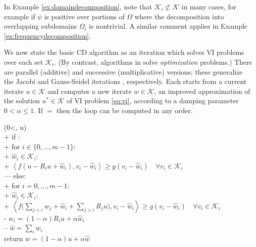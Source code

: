 \documentclass[letterpaper,final,12pt,reqno]{amsart}
\theoremstyle{cstyle}
\theoremstyle{dstyle}
\numberwithin{equation}{section}
\numberwithin{figure}{section}
\numberwithin{table}{section}
\numberwithin{theorem}{section}
\newcommand{\cK}{\mathcal{K}}
\newcommand{\ip}[2]{\left<#1,#2\right>}
\begin{document}
In Example \ref{ex:domaindecomposition}, note that $\cK_i \not\subset \cK$ in many cases, for example if $\psi$ is positive over portions of $\Omega$ where the decomposition into overlapping subdomains $\Omega_i$ is nontrivial.  A similar comment applies in Example \ref{ex:frequencydecomposition}.

We now state the basic CD algorithm as an iteration which solves VI problems over each set $\cK_i$.  (By contrast, algorithms in \cite{Tai2003} solve \emph{optimization} problems.)  There are parallel (additive) and successive (multiplicative) versions; these generalize the Jacobi and Gauss-Seidel iterations \cite{Greenbaum1997}, respectively.  Each starts from a current iterate $u \in \cK$ and computes a new iterate $w\in\cK$, an improved approximation of the solution $u^* \in \cK$ of VI problem \eqref{eq:vi}, according to a damping parameter $0<\alpha\le 1$.  If  $=$  then the  loop can be computed in any order.

\begin{pseudo*}
(0<\alpha{}, u\in\cK)\text{:} \\+
    if : \\+
        for $i \in \{0,\dots,m-1\}$: \\+
            $\hat w_i\in \cK_i$: \\+
                 $\boxed{\ip{f(u - R_i u + \hat w_i)}{v_i-\hat w_i} \ge g(v_i-\hat w_i)} \quad \forall v_i\in \cK_i$ \\---
    else: \\+
        for $i = 0,\dots,m-1$: \\+
            $\hat w_i\in \cK_i$: \\+
                $\displaystyle \boxed{\ip{f\Big(\sum_{j<i} w_j + \hat w_i + \sum_{j>i} R_j u\Big)}{v_i-\hat w_i} \ge g(v_i-\hat w_i)} \quad \forall v_i\in \cK_i$ \\-
            $w_i = (1-\alpha) R_i u + \alpha \hat w_i$ \\--
    $\hat w = \sum_i \hat w_i$ \\
    return $w=(1-\alpha) u + \alpha \hat w$
\end{pseudo*}
\end{document}
